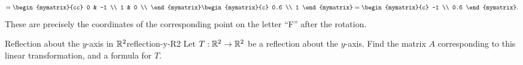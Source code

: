 \begin{solution}
\begin{equation*}
    = \begin{mymatrix}{cc}
      0 & -1 \\
      1 & 0 \\
    \end{mymatrix}
    \begin{mymatrix}{c} 0.6 \\ 1 \end{mymatrix}
    = \begin{mymatrix}{c} -1 \\ 0.6 \end{mymatrix}.
  \end{equation*}
  These are precisely the coordinates of the corresponding point on
  the letter ``F'' after the rotation.
\end{solution}

\begin{example}{Reflection about the $y$-axis in $\mathbb{R}^2$}{reflection-y-R2}
  Let $T:\mathbb{R}^2\to\mathbb{R}^2$ be a reflection about the $y$-axis. Find the
  matrix%
   $A$ corresponding to this
  linear transformation, and a formula for $T$.
\end{example}


